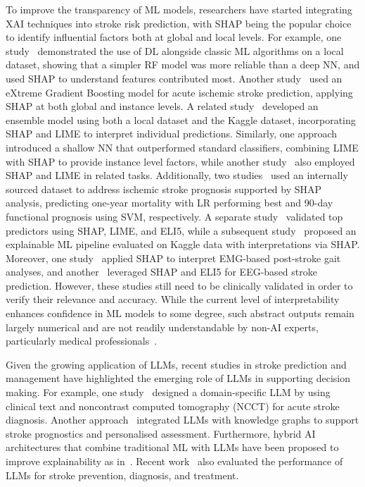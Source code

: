 \medskip
To improve the transparency of ML models, researchers have started integrating XAI techniques into stroke risk prediction, with SHAP being the popular choice to identify influential factors both at global and local levels. For example, one study~\cite{l7} demonstrated the use of DL alongside classic ML algorithms on a local dataset, showing that a simpler RF model was more reliable than a deep NN, and used SHAP to understand features contributed most. Another study~\cite{lee2023interpretable} used an eXtreme Gradient Boosting model for acute ischemic stroke prediction, applying SHAP at both global and instance levels. A related study~\cite{l8} developed an ensemble model using both a local dataset and the Kaggle dataset, incorporating SHAP and LIME to interpret individual predictions. Similarly, one approach~\cite{l9} introduced a shallow NN that outperformed standard classifiers, combining LIME with SHAP to provide instance level factors, while another study~\cite{l15} also employed SHAP and LIME in related tasks. Additionally, two studies~\cite{l10, l11} used an internally sourced dataset to address ischemic stroke prognosis supported by SHAP analysis, predicting one-year mortality with LR performing best and 90-day functional prognosis using SVM, respectively. A separate study~\cite{l12} validated top predictors using SHAP, LIME, and ELI5, while a subsequent study~\cite{l23} proposed an explainable ML pipeline evaluated on Kaggle data with interpretations via SHAP. Moreover, one study~\cite{l13} applied SHAP to interpret EMG-based post-stroke gait analyses, and another~\cite{l14} leveraged SHAP and ELI5 for EEG-based stroke prediction. However, these studies still need to be clinically validated in order to verify their relevance and accuracy. While the current level of interpretability enhances confidence in ML models to some degree, such abstract outputs remain largely numerical and are not readily understandable by non-AI experts, particularly medical professionals~\cite{l6}.

\medskip
Given the growing application of LLMs, recent studies in stroke prediction and management have highlighted the emerging role of LLMs in supporting
decision making. For example, one study~\cite{l20} designed
a domain-specific LLM by using clinical text and noncontrast
computed tomography (NCCT) for acute stroke diagnosis. Another approach~\cite{sarabadani2025skg} integrated LLMs with knowledge graphs to support stroke prognostics and personalised assessment. Furthermore,
hybrid AI architectures that combine traditional ML with LLMs
have been proposed to improve explainability as in~\cite{l22}. Recent work~\cite{l17} also evaluated the performance of LLMs for stroke prevention, diagnosis, and treatment.

